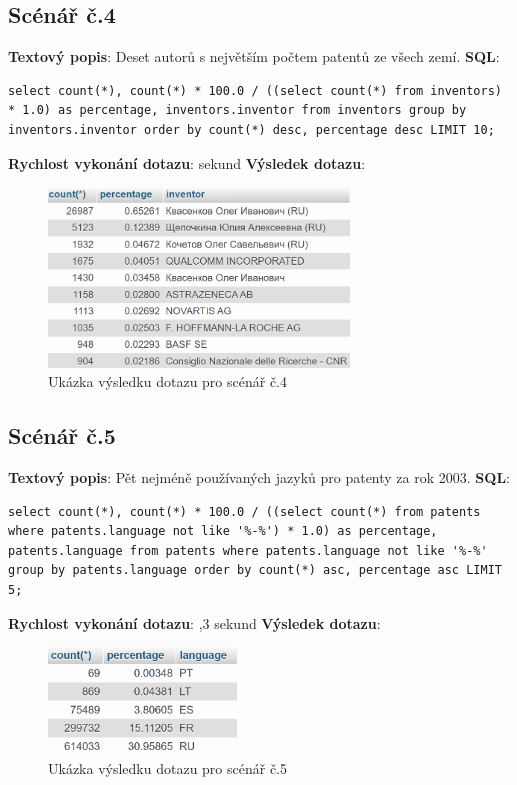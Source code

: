 \subsection{Scénář č.4} 
\textbf{Textový popis}: Deset autorů s největším počtem patentů ze všech zemí.
\newline
\textbf{SQL}: 
\begin{lstlisting}[label = {lst:elements_a}]
select count(*), count(*) * 100.0 / ((select count(*) from inventors) * 1.0) as percentage, inventors.inventor from inventors group by inventors.inventor order by count(*) desc, percentage desc LIMIT 10;
\end{lstlisting}
\textbf{Rychlost vykonání dotazu}:  sekund
\newline
\textbf{Výsledek dotazu}:
\begin{figure}[H]
\centering
\includegraphics[width=8cm]{img/scenare/scenar_4}
\caption{Ukázka výsledku dotazu pro scénář č.4}
\label{fig:scenar4}
\end{figure}

\newpage
\subsection{Scénář č.5}
\textbf{Textový popis}: Pět nejméně používaných jazyků pro patenty za rok 2003.
\newline
\textbf{SQL}: 
\begin{lstlisting}[label = {lst:elements_a}]
select count(*), count(*) * 100.0 / ((select count(*) from patents where patents.language not like '%-%') * 1.0) as percentage, patents.language from patents where patents.language not like '%-%' group by patents.language order by count(*) asc, percentage asc LIMIT 5;
\end{lstlisting}
\textbf{Rychlost vykonání dotazu}: ,3 sekund
\newline
\textbf{Výsledek dotazu}:
\begin{figure}[H]
\centering
\includegraphics[width=5cm]{img/scenare/scenar_5}
\caption{Ukázka výsledku dotazu pro scénář č.5}
\label{fig:scenar5}
\end{figure}


